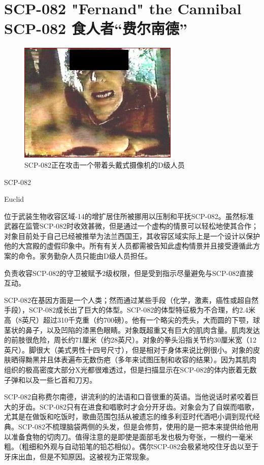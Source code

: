 \chapter[SCP-082 食人者“费尔南德”]{
    SCP-082 "Fernand" the Cannibal\\
    SCP-082 食人者“费尔南德”
}

\label{chap:SCP-082}

\begin{figure}[H]
    \centering
    \includegraphics[width=0.5\linewidth]{images/SCP.082.jpg}
    \caption*{SCP-082正在攻击一个带着头戴式摄像机的D级人员}
\end{figure}

SCP-082

Euclid

位于武装生物收容区域-14的增扩居住所被挪用以压制和平抚SCP-082。虽然标准武器在监管SCP-082时收效甚微，但是通过一个虚构的情景可以轻松地使其合作；对象目前处于自己已经被推举为法兰西国王，其收容区域实际上是一个设计以保护他的大宫殿的虚假印象中。所有有关人员都需被告知此虚构情景并且接受遵循此方案的命令。家务勤杂人员只能由D级人员担任。

负责收容SCP-082的守卫被赋予2级权限，但是受到指示尽量避免与SCP-082直接互动。

SCP-082在基因方面是一个人类；然而通过某些手段（化学，激素，癌性或超自然手段），SCP-082成长出了巨大的体型。SCP-082的体型特征极为不合理，约2.4米高（8英尺）超过310千克重（约700磅）。他有一个略尖的秃头，大而圆的下颚，球茎状的鼻子，以及凹陷的漆黑色眼睛。对象既超重又有巨大的肌肉含量。肌肉发达的前肢很危险，周长约71厘米（约28英尺）。对象的拳头沿指关节约30厘米宽（12英尺）。脚很大（美式男性十四号尺寸），但是相对于身体来说比例很小。对象的皮肤晒得黝黑并且体表遍布无数伤疤（多年来试图压制和收容的结果）。因为其肌肉组织的极高密度大部分X光都很难透过，但是扫描显示在SCP-082的体内嵌着无数子弹和以及一些匕首和刀刃。

SCP-082自称费尔南德，讲流利的的法语和口音很重的英语。当他说话时紧咬着巨大的牙齿。SCP-082只有在进食和唱歌时才会分开牙齿。对象会为了自娱而唱歌，尤其是在做饭和吃饭时，歌曲范围包括从被遗忘的维多利亚时代酒吧小调到现代经典。SCP-082不梳理脑袋两侧的头发，但是会修剪，使用的是一把本来提供给他用以准备食物的切肉刀。值得注意的是即使是面部毛发也极为夸张，一根约一毫米粗。（粗细和外观与自动铅笔的铅芯相似）。偶尔SCP-082会极紧地咬住牙齿以至于牙床出血，但是不知原因。这被视为正常现象。

